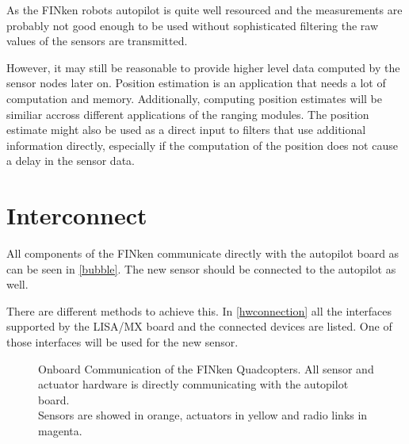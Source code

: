 As the FINken robots autopilot is quite well resourced and the measurements are probably not good enough to be used without sophisticated filtering the raw values of the sensors are transmitted.

However, it may still be reasonable to provide higher level data computed by the sensor nodes later on.
Position estimation is an application that needs a lot of computation and memory.
Additionally, computing position estimates will be similiar accross different applications of the ranging modules.
The position estimate might also be used as a direct input to filters that use additional information directly, especially if the computation of the position does not cause a delay in the sensor data.


\section{Interconnect}
All components of the FINken communicate directly with the autopilot board as can be seen in \autoref{bubble}.
The new sensor should be connected to the autopilot as well.

There are different methods to achieve this.
In \autoref{hwconnection} all the interfaces supported by the LISA/MX board and the connected devices are listed.
One of those interfaces will be used for the new sensor.

\begin{figure}[h]
	\centering	
	\label{bubble}
	\caption[Onboard Communication of the FINken Quadcopters]
	{Onboard Communication of the FINken Quadcopters. All sensor and actuator hardware is directly communicating with the autopilot board.
		\\
		Sensors are showed in orange, actuators in yellow and radio links in magenta.
	}
\end{figure}

